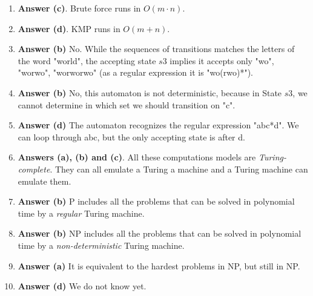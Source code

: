 \documentclass[11pt]{article}
\begin{document}
\begin{enumerate}
\item \textbf{Answer (c)}. Brute force runs in \(O(m \cdot n)\).

\item \textbf{Answer (d)}. KMP runs in \(O(m + n)\).

\item \textbf{Answer (b)} No. While the sequences of transitions matches the
letters of the word "world", the accepting state \(s3\) implies it
accepts only "wo", "worwo", "worworwo" (as a regular expression
it is "wo(rwo)*").

\item \textbf{Answer (b)} No, this automaton is not deterministic, because in
State \(s3\), we cannot determine in which set we should transition
on "c".

\item \textbf{Answer (d)} The automaton recognizes the regular expression
"abc*d". We can loop through abc, but the only accepting state is
after d.

\item \textbf{Answers (a), (b) and (c)}. All these computations models are
\emph{Turing-complete}. They can all emulate a Turing a machine and a
Turing machine can emulate them.

\item \textbf{Answer (b)} P includes all the problems that can be solved in polynomial time
by a \emph{regular} Turing machine.

\item \textbf{Answer (b)} NP includes all the problems that can be solved in
polynomial time by a \emph{non-deterministic} Turing machine.

\item \textbf{Answer (a)} It is equivalent to the hardest problems in NP, but
still in NP.

\item \textbf{Answer (d)} We do not know yet.
\end{enumerate}
\end{document}

